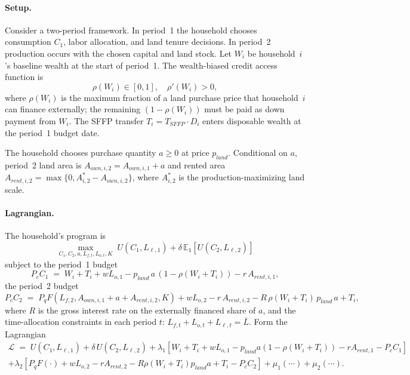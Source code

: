 \documentclass[11pt, a4paper]{article}
\begin{document}
\paragraph{Setup.} Consider a two-period framework. In period~1 the household
chooses consumption $C_1$, labor allocation, and land tenure decisions. In
period~2 production occurs with the chosen capital and land stock. Let $W_i$
be household~$i$'s baseline wealth at the start of period~1. The wealth-biased
credit access function is
\begin{equation}
\rho(W_i) \in [0, 1], \quad \rho'(W_i) > 0,
\label{eq:appB-rho}
\end{equation}
where $\rho(W_i)$ is the maximum fraction of a land purchase price that
household~$i$ can finance externally; the remaining $(1-\rho(W_i))$ must be
paid as down payment from $W_i$. The SFFP transfer $T_i = T_{SFFP} \cdot D_i$
enters disposable wealth at the period~1 budget date.

The household chooses purchase quantity $a \ge 0$ at price $p_{land}$.
Conditional on $a$, period~2 land area is $A_{own,i,2} = A_{own,i,1} + a$ and
rented area $A_{rent,i,2} = \max\{0, A^*_{i,2} - A_{own,i,2}\}$, where
$A^*_{i,2}$ is the production-maximizing land scale.

\paragraph{Lagrangian.} The household's program is
\begin{equation}
\max_{C_1, C_2, a, L_{f,t}, L_{o,t}, K} \; U(C_1, L_{\ell,1}) + \delta\, \mathbb{E}_1\!\left[U(C_2, L_{\ell,2})\right]
\label{eq:appB-objective}
\end{equation}
subject to the period~1 budget
\begin{equation}
P_c C_1 \;=\; W_i + T_i + w L_{o,1} - p_{land}\, a\, (1 - \rho(W_i + T_i)) - r\, A_{rent,i,1},
\label{eq:appB-budget1}
\end{equation}
the period~2 budget
\begin{equation}
P_c C_2 \;=\; P_q F(L_{f,2}, A_{own,i,1} + a + A_{rent,i,2}, K) + w L_{o,2} - r\, A_{rent,i,2} - R\, \rho(W_i + T_i)\, p_{land}\, a + T_i,
\label{eq:appB-budget2}
\end{equation}
where $R$ is the gross interest rate on the externally financed share of $a$,
and the time-allocation constraints in each period $t$:
$L_{f,t} + L_{o,t} + L_{\ell,t} = \bar L$. Form the Lagrangian
\begin{multline}
\mathcal{L} \;=\; U(C_1, L_{\ell,1}) + \delta\, U(C_2, L_{\ell,2})
+ \lambda_1\!\left[W_i + T_i + w L_{o,1} - p_{land} a (1{-}\rho(W_i{+}T_i)) - r A_{rent,1} - P_c C_1 \right] \\
+ \lambda_2\!\left[P_q F(\cdot) + w L_{o,2} - r A_{rent,2} - R \rho(W_i{+}T_i) p_{land} a + T_i - P_c C_2\right] + \mu_1 (\cdots) + \mu_2 (\cdots).
\label{eq:appB-lagrangian}
\end{multline}
\end{document}
